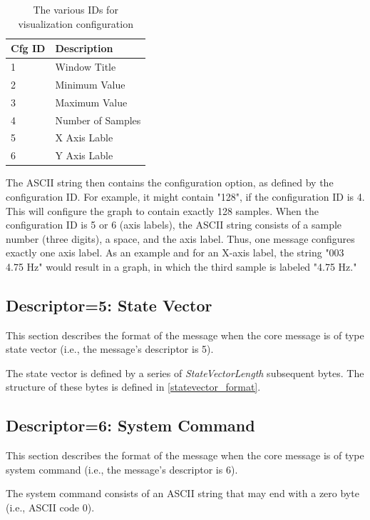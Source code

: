 \documentclass[letterpaper,oneside,12pt]{book}
\begin{document}
\begin{table}[ht]
 \centering
 \begin{tabular}{|l|l|}
  \hline
  \textbf{Cfg ID} & \textbf{Description} \\
  \hline
  1 & Window Title \\
  \hline
  2 & Minimum Value \\
  \hline
  3 & Maximum Value \\
  \hline
  4 & Number of Samples \\
  \hline
  5 & X Axis Lable \\
  \hline
  6 & Y Axis Lable \\
  \hline
 \end{tabular}
 \caption{The various IDs for visualization configuration}
 \label{tab:viscfg_table}
\end{table} 

The ASCII string then contains the configuration option, as defined by the 
configuration ID. For example, it might contain "128", if the configuration ID 
is 4. This will configure the graph to contain exactly 128 samples. When the 
configuration ID is 5 or 6 (axis labels), the ASCII string consists of a sample 
number (three digits), a space, and the axis label. Thus, one message configures 
exactly one axis label. As an example and for an X-axis label, the string "003 
4.75 Hz" would result in a graph, in which the third sample is labeled "4.75 
Hz."


\subsection{Descriptor=5: State Vector}
\label{statevector}

This section describes the format of the message when the core message is of 
type state vector (i.e., the message's descriptor is 5). 

The state vector is defined by a series of \textit{StateVectorLength} subsequent 
bytes. The structure of these bytes is defined in \ref{statevector_format}.


\subsection{Descriptor=6: System Command}
\label{sec:syscmd}

This section describes the format of the message when the core message is of 
type system command (i.e., the message's descriptor is 6). 

The system command consists of an ASCII string that may end with a zero byte 
(i.e., ASCII code 0).
\end{document}
